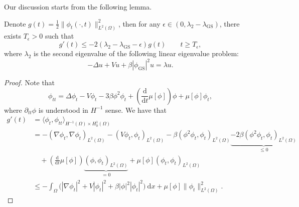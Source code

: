 \documentclass{siamart250211}
\def\nn{\nonumber}
\begin{document}
Our discussion starts from the following lemma.
\begin{lemma}\label{lem: key lemma}
Denote $g(t) = \frac12\|\phi_t(\cdot,t) \|_{L^2(\Omega)}^2$, then for any $\epsilon \in (0, \lambda_2 - \lambda_{\mathrm{GS}})$, there exists $T_{\epsilon} > 0$ such that 
	\begin{equation}\label{equ: key inequality}
		g'(t) \le - 2(\lambda_2 - \lambda_{\text{GS}} - \epsilon) g(t) \qquad t \ge T_{\epsilon},
	\end{equation}
	where $\lambda_2$ is the second eigenvalue of the following linear eigenvalue problem: 
	\begin{equation*}
		- \Delta u + V u + \beta |\phi_{\text{GS}}|^2 u = \lambda u.
	\end{equation*}
\end{lemma}
\begin{proof}
	Note that 
\begin{equation*}
	\phi_{tt} = \Delta \phi_t - V \phi_t - 3 \beta \phi^2 \phi_t + \left( \frac{\text{d}}{\text{d}t} \mu[\phi] \right) \phi + \mu[\phi]\phi_t,
\end{equation*}
where $\partial_{tt}\phi$ is understood in $H^{-1}$ sense. We have that 
\begin{align}
	g'(t) & = \langle\phi_t, \phi_{tt}\rangle_{H^{-1}(\Omega) \times H_0^1(\Omega)} \nn \\
	& = -(\nabla \phi_t,  \nabla \phi_t)_{L^2(\Omega)} - (V\phi_t,\phi_t)_{L^2(\Omega)}  - \beta (\phi^2 \phi_t, \phi_t)_{L^2(\Omega)} \underbrace{- 2\beta (\phi^2 \phi_t, \phi_t)_{L^2(\Omega)}}_{\le 0} \nn \\
	& \quad + \left( \frac{\text{d}}{\text{d}t} \mu[\phi] \right) \underbrace{(\phi, \phi_t)_{L^2(\Omega)}}_{ = 0} + \mu[\phi] (\phi_t,\phi_t)_{L^2(\Omega)} \nn \\
	& \le - \int_{\Omega} \Big( |\nabla \phi_t|^2 + V|\phi_t|^2 + \beta|\phi|^2 |\phi_t|^2 \Big) \ \text{d}x + \mu[\phi]\|\phi_t\|_{L^2(\Omega)}^2.
\end{align}


\end{proof}
\end{document}
